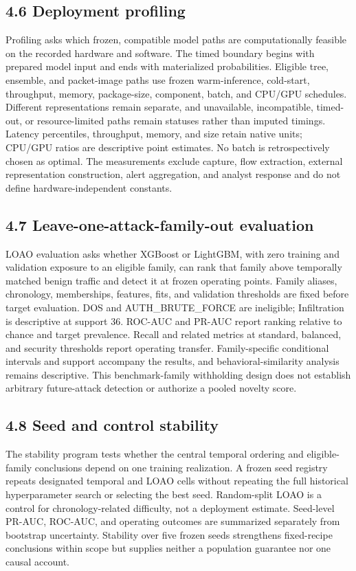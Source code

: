 \documentclass[preprint,12pt]{elsarticle}
\begin{document}
\subsection{4.6 Deployment profiling}
Profiling asks which frozen, compatible model paths are computationally feasible on the recorded hardware and software. The timed boundary begins with prepared model input and ends with materialized probabilities. Eligible tree, ensemble, and packet-image paths use frozen warm-inference, cold-start, throughput, memory, package-size, component, batch, and CPU/GPU schedules. Different representations remain separate, and unavailable, incompatible, timed-out, or resource-limited paths remain statuses rather than imputed timings.
Latency percentiles, throughput, memory, and size retain native units; CPU/GPU ratios are descriptive point estimates. No batch is retrospectively chosen as optimal. The measurements exclude capture, flow extraction, external representation construction, alert aggregation, and analyst response and do not define hardware-independent constants.

\subsection{4.7 Leave-one-attack-family-out evaluation}
LOAO evaluation asks whether XGBoost or LightGBM, with zero training and validation exposure to an eligible family, can rank that family above temporally matched benign traffic and detect it at frozen operating points. Family aliases, chronology, memberships, features, fits, and validation thresholds are fixed before target evaluation. DOS and AUTH\_BRUTE\_FORCE are ineligible; Infiltration is descriptive at support 36.
ROC-AUC and PR-AUC report ranking relative to chance and target prevalence. Recall and related metrics at standard, balanced, and security thresholds report operating transfer. Family-specific conditional intervals and support accompany the results, and behavioral-similarity analysis remains descriptive. This benchmark-family withholding design does not establish arbitrary future-attack detection or authorize a pooled novelty score.

\subsection{4.8 Seed and control stability}
The stability program tests whether the central temporal ordering and eligible-family conclusions depend on one training realization. A frozen seed registry repeats designated temporal and LOAO cells without repeating the full historical hyperparameter search or selecting the best seed. Random-split LOAO is a control for chronology-related difficulty, not a deployment estimate. Seed-level PR-AUC, ROC-AUC, and operating outcomes are summarized separately from bootstrap uncertainty. Stability over five frozen seeds strengthens fixed-recipe conclusions within scope but supplies neither a population guarantee nor one causal account.
\end{document}
